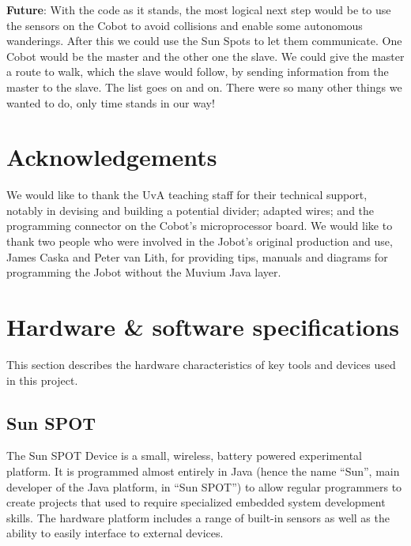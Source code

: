 \documentclass[a4paper,10pt]{article} %
\begin{document}
\noindent \textbf{Future}: With the code as it stands, the most logical next step would be to use the sensors on the Cobot to avoid collisions and enable some autonomous wanderings. After this we could use the Sun Spots to let them
communicate. One Cobot would be the master and the other one the slave. We
could give the master a route to walk, which the slave would follow, by sending information from the master to the slave. The list goes on
and on. There were so many other things we wanted to do, only time stands in our way! 


\section{Acknowledgements} %

We would like to thank the UvA teaching staff for their technical support, notably in devising and building a potential divider; adapted wires; and the programming connector on the Cobot's microprocessor board. We would like to thank two people who were involved in the Jobot's original production and use, James Caska and Peter van Lith, for providing tips, manuals and diagrams for programming the Jobot without the Muvium Java layer.


\pagebreak

\appendix

\section{Hardware \& software specifications} %
\label{app:robot-hardware}

This section describes the hardware characteristics of key tools and devices
used in this project.

\subsection{Sun SPOT} %
\label{app:Sun SPOT}

The Sun SPOT Device is a small, wireless, battery powered experimental platform.
It is programmed almost entirely in Java (hence the name ``Sun'', main developer
of the Java platform, in ``Sun SPOT'') to allow regular programmers to create
projects that used to require specialized embedded system development skills.
The hardware platform includes a range of built-in sensors as well as the
ability to easily interface to external devices.
\end{document}
